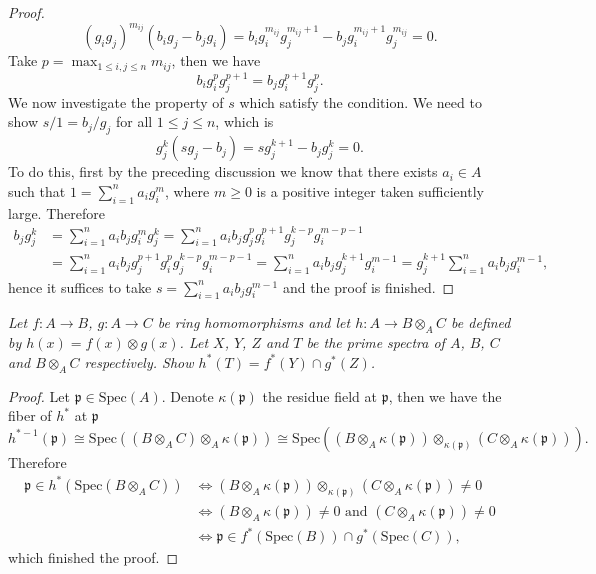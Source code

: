 \begin{proof}
$$
\left( g_ig_j \right) ^{m_{ij}}\left( b_ig_j-b_jg_i \right) =b_ig_{i}^{m_{ij}}g_{j}^{m_{ij}+1}-b_jg_{i}^{m_{ij}+1}g_{j}^{m_{ij}}=0.
$$
Take $p=\max_{1\le i,j\le n}m_{ij}$, then we have 
$$
b_ig_{i}^{p}g_{j}^{p+1}=b_jg_{i}^{p+1}g_{j}^{p}.
$$
We now investigate the property of $s$ which satisfy the condition. We need to show $s/1=b_j/g_j$ for all $1\le j\le n$, which is 
$$
g_{j}^{k}\left( sg_j-b_j \right) =sg_{j}^{k+1}-b_jg_{j}^{k}=0.
$$
To do this, first by the preceding discussion we know that there exists $a_i\in A$ such that $1=\sum_{i=1}^n{a_ig_{i}^{m}}$, where $m\ge 0$ is a positive integer taken sufficiently large. Therefore 
$$
\begin{aligned}
b_jg_{j}^{k}&=\sum_{i=1}^n{a_ib_jg_{i}^{m}g_{j}^{k}}=\sum_{i=1}^n{a_ib_jg_{j}^{p}g_{i}^{p+1}g_{j}^{k-p}g_{i}^{m-p-1}}
\\
&=\sum_{i=1}^n{a_ib_jg_{j}^{p+1}g_{i}^{p}g_{j}^{k-p}g_{i}^{m-p-1}}=\sum_{i=1}^n{a_ib_jg_{j}^{k+1}g_{i}^{m-1}}=g_{j}^{k+1}\sum_{i=1}^n{a_ib_jg_{i}^{m-1}},
\end{aligned}
$$
hence it suffices to take $s=\sum_{i=1}^n{a_ib_jg_{i}^{m-1}}$ and the proof is finished.
\end{proof}
\begin{problem}\em
Let $f:A\to B$, $g:A\to C$ be ring homomorphisms and let $h:A\to B\otimes_AC$ be defined by $h(x)=f(x)\otimes g(x)$. Let $X$, $Y$, $Z$ and $T$ be the prime spectra of $A$, $B$, $C$ and $B\otimes_AC$ respectively. Show $h^*(T)=f^*(Y)\cap g^*(Z)$.
\end{problem}
\begin{proof}
Let $\mathfrak{p}\in\mathrm{Spec}(A)$. Denote $\kappa(\mathfrak{p})$ the residue field at $\mathfrak{p}$, then we have the fiber of $h^*$ at $\mathfrak{p}$
$$
h^{*-1}\left( \mathfrak{p} \right) \cong \mathrm{Spec}\left( \left( B\otimes _AC \right) \otimes _A\kappa \left( \mathfrak{p} \right) \right) \cong \mathrm{Spec}\left( \left( B\otimes _A\kappa \left( \mathfrak{p} \right) \right) \otimes _{\kappa \left( \mathfrak{p} \right)}\left( C\otimes _A\kappa \left( \mathfrak{p} \right) \right) \right) .
$$
Therefore 
$$
\begin{aligned}
\mathfrak{p} \in h^*\left( \mathrm{Spec}\left( B\otimes _AC \right) \right) & \iff \left( B\otimes _A\kappa \left( \mathfrak{p} \right) \right) \otimes _{\kappa \left( \mathfrak{p} \right)}\left( C\otimes _A\kappa \left( \mathfrak{p} \right) \right) \ne 0
\\
& \iff \left( B\otimes _A\kappa \left( \mathfrak{p} \right) \right) \ne 0\text{ and }\left( C\otimes _A\kappa \left( \mathfrak{p} \right) \right) \ne 0
\\
& \iff \mathfrak{p} \in f^*\left( \mathrm{Spec}\left( B \right) \right) \cap g^*\left( \mathrm{Spec}\left( C \right) \right) ,
\end{aligned}
$$
which finished the proof.
\end{proof}
